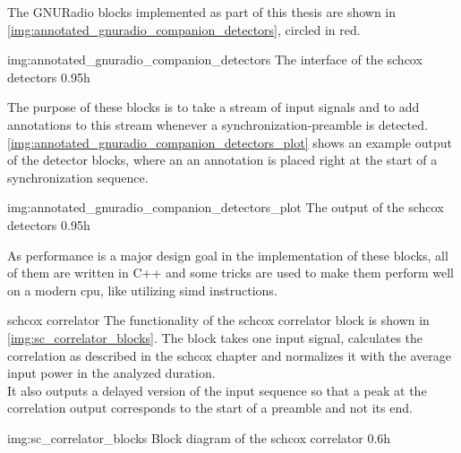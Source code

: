 The GNURadio blocks implemented as part of this thesis are
shown in \autoref{img:annotated_gnuradio_companion_detectors},
circled in red.

             {img:annotated_gnuradio_companion_detectors}
             {The interface of the \gls{schcox} detectors}
             {0.95}{h}

The purpose of these blocks is to take a stream of input signals
and to add annotations to this stream whenever a synchronization-preamble
is detected.
\autoref{img:annotated_gnuradio_companion_detectors_plot} shows an example output
of the detector blocks, where an an annotation is placed right at the start of a
synchronization sequence.

             {img:annotated_gnuradio_companion_detectors_plot}
             {The output of the \gls{schcox} detectors}
             {0.95}{h}

As performance is a major design goal in the implementation of these blocks,
all of them are written in C++ and some tricks are used to make them
perform well on a modern \acrshort{cpu}, like utilizing
\acrshort{simd} instructions.

\begin{subchapter}{\acrlong{schcox} correlator}
  The functionality of the \acrlong{schcox} correlator
  block is shown in \autoref{img:sc_correlator_blocks}.
  The block takes one input signal, calculates the correlation
  as described in the \acrlong{schcox} chapter and normalizes it
  with the average input power in the analyzed duration. \\

  It also outputs a delayed version of the input sequence so that
  a peak at the correlation output corresponds to the start of a
  preamble and not its end.

               {img:sc_correlator_blocks}
               {Block diagram of the \acrlong{schcox} correlator}
               {0.6}{h}


\end{subchapter}

